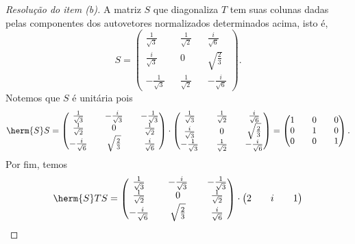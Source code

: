 \begin{proof}[Resolução do item (b)]
    A matriz \(S\) que diagonaliza \(T\) tem suas colunas dadas pelas componentes dos autovetores normalizados determinados acima, isto é,
    \begin{equation*}
        S = \begin{pmatrix}
            \frac{1}{\sqrt{3}} && \frac{1}{\sqrt{2}} && \frac{i}{\sqrt{6}}\\
            \frac{i}{\sqrt{3}} && 0 && \sqrt{\frac23}\\
            -\frac{1}{\sqrt{3}}&& \frac{1}{\sqrt{2}} && -\frac{i}{\sqrt{6}}
        \end{pmatrix}.
    \end{equation*}
    Notemos que \(S\) é unitária pois
    \begin{equation*}
        \herm{S}S = \begin{pmatrix}
            \frac{1}{\sqrt{3}} && -\frac{i}{\sqrt{3}} && -\frac{1}{\sqrt{3}}\\
            \frac{1}{\sqrt{2}} && 0 && \frac{1}{\sqrt{2}}\\
            -\frac{i}{\sqrt{6}}&& \sqrt{\frac23} && \frac{i}{\sqrt{6}}
        \end{pmatrix}\cdot
        \begin{pmatrix}
            \frac{1}{\sqrt{3}} && \frac{1}{\sqrt{2}} && \frac{i}{\sqrt{6}}\\
            \frac{i}{\sqrt{3}} && 0 && \sqrt{\frac23}\\
            -\frac{1}{\sqrt{3}}&& \frac{1}{\sqrt{2}} && -\frac{i}{\sqrt{6}}
        \end{pmatrix} =
        \begin{pmatrix}
            1 && 0 && 0\\
            0 && 1 && 0\\
            0 && 0 && 1
        \end{pmatrix}.
    \end{equation*}
    Por fim, temos
    \begin{equation*}
        \herm{S}TS =
        \begin{pmatrix}
            \frac{1}{\sqrt{3}} && -\frac{i}{\sqrt{3}} && -\frac{1}{\sqrt{3}}\\
            \frac{1}{\sqrt{2}} && 0 && \frac{1}{\sqrt{2}}\\
            -\frac{i}{\sqrt{6}}&& \sqrt{\frac23} && \frac{i}{\sqrt{6}}
        \end{pmatrix}
        \cdot
        \begin{pmatrix}
            2 && i && 1\\

\end{pmatrix}
\end{equation*}
\end{proof}
